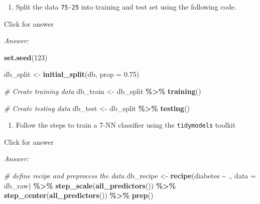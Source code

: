 \documentclass[
]{book}
\newenvironment{Shaded}{\begin{snugshade}}{\end{snugshade}}
\newcommand{\AttributeTok}[1]{\textcolor[rgb]{0.13,0.29,0.53}{#1}}
\newcommand{\CommentTok}[1]{\textcolor[rgb]{0.56,0.35,0.01}{\textit{#1}}}
\newcommand{\DecValTok}[1]{\textcolor[rgb]{0.00,0.00,0.81}{#1}}
\newcommand{\FloatTok}[1]{\textcolor[rgb]{0.00,0.00,0.81}{#1}}
\newcommand{\FunctionTok}[1]{\textcolor[rgb]{0.13,0.29,0.53}{\textbf{#1}}}
\newcommand{\NormalTok}[1]{#1}
\newcommand{\OtherTok}[1]{\textcolor[rgb]{0.56,0.35,0.01}{#1}}
\newcommand{\SpecialCharTok}[1]{\textcolor[rgb]{0.81,0.36,0.00}{\textbf{#1}}}
\providecommand{\tightlist}{%
  \setlength{\itemsep}{0pt}\setlength{\parskip}{0pt}}
\begin{document}
\begin{enumerate}
\def\labelenumi{\alph{enumi}.}
\tightlist
\item
  Split the data \texttt{75-25} into training and test set using the following code.
\end{enumerate}

Click for answer

\emph{Answer:}

\begin{Shaded}
\begin{Highlighting}[]
\FunctionTok{set.seed}\NormalTok{(}\DecValTok{123}\NormalTok{)}

\NormalTok{db\_split }\OtherTok{\textless{}{-}} \FunctionTok{initial\_split}\NormalTok{(db, }\AttributeTok{prop =} \FloatTok{0.75}\NormalTok{)}

\CommentTok{\# Create training data}
\NormalTok{db\_train }\OtherTok{\textless{}{-}}\NormalTok{ db\_split }\SpecialCharTok{\%\textgreater{}\%} \FunctionTok{training}\NormalTok{()}

\CommentTok{\# Create testing data}
\NormalTok{db\_test }\OtherTok{\textless{}{-}}\NormalTok{ db\_split }\SpecialCharTok{\%\textgreater{}\%}  \FunctionTok{testing}\NormalTok{()}
\end{Highlighting}
\end{Shaded}

\begin{enumerate}
\def\labelenumi{\alph{enumi}.}
\setcounter{enumi}{1}
\tightlist
\item
  Follow the steps to train a 7-NN classifier using the \texttt{tidymodels} toolkit
\end{enumerate}

Click for answer

\emph{Answer:}

\begin{Shaded}
\begin{Highlighting}[]
\CommentTok{\# define recipe and preprocess the data}
\NormalTok{db\_recipe }\OtherTok{\textless{}{-}} \FunctionTok{recipe}\NormalTok{(diabetes }\SpecialCharTok{\textasciitilde{}}\NormalTok{ ., }\AttributeTok{data =}\NormalTok{ db\_raw) }\SpecialCharTok{\%\textgreater{}\%}
  \FunctionTok{step\_scale}\NormalTok{(}\FunctionTok{all\_predictors}\NormalTok{()) }\SpecialCharTok{\%\textgreater{}\%}
  \FunctionTok{step\_center}\NormalTok{(}\FunctionTok{all\_predictors}\NormalTok{()) }\SpecialCharTok{\%\textgreater{}\%}
  \FunctionTok{prep}\NormalTok{()}
\end{Highlighting}
\end{Shaded}
\end{document}
